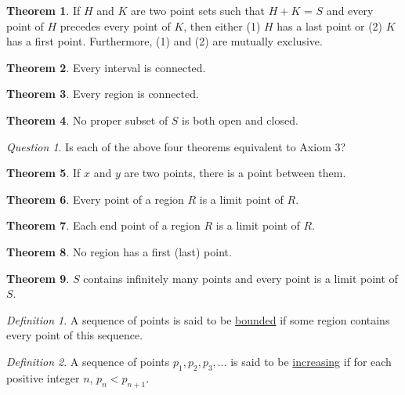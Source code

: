 \documentclass[12pt, oneside, letter] {amsart}
\theoremstyle {definition}
\newtheorem {thm} {Theorem}
\theoremstyle {remark}
\newtheorem* {defn} {Definition}
\newtheorem* {qn} {Question}
\begin{document}
\begin{thm}
  If $H$ and $K$ are two point sets such that $H + K$ = $S$ and every
  point of $H$ precedes every point of $K$, then either (1) $H$ has a
  last point or (2) $K$ has a first point. Furthermore, (1) and (2)
  are mutually exclusive.
\end{thm}

\begin{thm}
  Every interval is connected.
\end{thm}

\begin{thm}
  Every region is connected.
\end{thm}

\begin{thm}
  No proper subset of $S$ is both open and closed.
\end{thm}

\begin{qn}
  Is each of the above four theorems equivalent to Axiom 3?
\end{qn}

\begin{thm}
  If $x$ and $y$ are two points, there is a point between them.
\end{thm}

\begin{thm}
  Every point of a region $R$ is a limit point of $R$.
\end{thm}

\begin{thm}
  Each end point of a region $R$ is a limit point of $R$.
\end{thm}

\begin{thm}
  No region has a first (last) point.
\end{thm}

\begin{thm}
  $S$ contains infinitely many points and every point is a limit point
  of $S$.
\end{thm}

\begin{defn}
  A sequence of points is said to be \underline {bounded} if some
  region contains every point of this sequence.
\end{defn}

\begin{defn}
  A sequence of points $p_1, p_2, p_3, \dots$ is said to be \underline
  {increasing} if for each positive integer $n$, $p_n < p_{n+1}$.
\end{defn}
\end{document}
